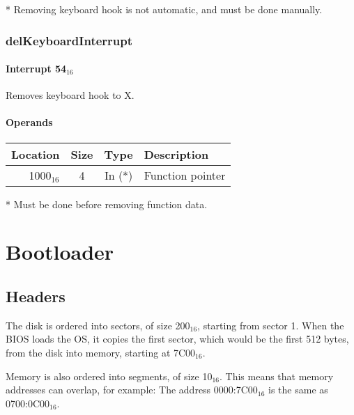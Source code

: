 \documentclass{article}
\begin{document}
* Removing keyboard hook is not automatic, and must be done manually.

\subsubsection{delKeyboardInterrupt}

\paragraph{Interrupt 54$_{16}$}

Removes keyboard hook to X.

\paragraph{Operands}

\begin{tabular}{|r|c|c|l|}
	\hline
	\textbf{Location} & \textbf{Size} & \textbf{Type} & \textbf{Description} \\
	\hline
	1000$_{16}$ & 4 & In (*) & Function pointer \\
	\hline
\end{tabular}

* Must be done before removing function data.


\newpage

\section{Bootloader}

\subsection{Headers}

The disk is ordered into sectors, of size 200$_{16}$, starting from sector 1\cite{sector size}.
When the BIOS loads the OS, it copies the first sector,
which would be the first 512 bytes, from the disk into memory,
starting at 7C00$_{16}$\cite{7c00}.

Memory is also ordered into segments, of size 10$_{16}$\cite{memory segments}. This means that memory
addresses can overlap, for example:
The address 0000:7C00$_{16}$ is the same as 0700:0C00$_{16}$.
\end{document}
